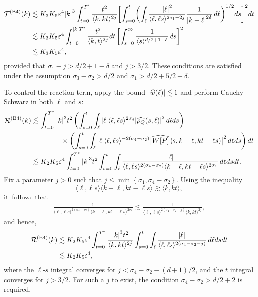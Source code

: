 \documentclass[JEP,XML,SOM,Unicode]{cedram}
\newcommand{\babs}[1]{\bigl|#1\bigr|}
\theoremstyle{plain}
\theoremstyle{remark}
\newcommand{\br}[1]{\left(#1\right)}
\newcommand{\bbbr}[1]{\biggl(#1 \biggr)}
\newcommand{\ak}{\abs{k}}
\newcommand{\sbbbr}[1]{\biggl[#1\biggr]}
\newcommand{\sbr}[1]{\left[#1\right]}
\newcommand{\jb}[1]{\langle#1\rangle}
\newcommand{\set}[1]{\left\{#1\right\}}
\newcommand{\ep}{\varepsilon}
\begin{document}
\begin{align*}
\mathcal{T}^{\mathrm{(B4)}}(k)&\lesssim K_3K_5\ep^4\ak^3\int_{t=0}^{T^*}\frac{t^2}{\jb{k,kt}^{2j}}\sbbbr{\int_{s=0}^t\bbbr{\int_\ell\frac{\abs{\ell}^2}{\jb{\ell,\ell s}^{2\sigma_1-2j}}\frac{1}{\abs{k-\ell}^{2\delta}}\,d\ell}^{1/2} ds}^2dt\\
&\lesssim K_3K_5\ep^4\int_{t=0}^{\ak T^*}\frac{t^2}{\jb{k,t}^{2j}}dt\sbr{\int_{s=0}^\infty\frac{1}{\jb{s}^{{d/2}+1-\delta}} \,ds}^2\\
&\lesssim K_3K_5\ep^4,
\end{align*}provided that $\sigma_1-j>d/2+1-\delta$ and $j>3/2$. These conditions are satisfied under the assumption $\sigma_3-\sigma_2>d/2$ and $\sigma_1>d/2+5/2-\delta$.

To control the reaction term, apply the bound $\abs{\widehat w(\ell)}\lesssim1$ and perform Cauchy--Schwarz in both $\ell$ and $s$:
\begin{align*}
\mathcal{R}^{\mathrm{(B4)}}(k)&\lesssim \int_{t=0}^{T^*}\abs{k}^3t^2\br{\int_{s=0}^t\int_\ell\abs{\ell}\jb{\ell,\ell s}^{2\sigma_4}\abs{\widehat{\rho_Q}(s,\ell)}^2\,d\ell ds}\\ &\hspace{1.5cm}\times\br{\int_{s=0}^t\int_\ell\abs{\ell}\jb{\ell,\ell s}^{-2(\sigma_4-\sigma_2)}\babs{\widehat {W[P]}\br{s,k-\ell,kt-\ell s}}^2\,d\ell ds}dt\\
&\lesssim K_2K_5 \ep^4\int_{t=0}^{T^*}\abs{k}^3t^2\int_{s=0}^t\int_\ell \frac{\abs{\ell}}{\jb{\ell,\ell s}^{2(\sigma_4-\sigma_2)}\jb{k-\ell,kt-\ell s}^{2\sigma_1}}\,d\ell dsdt.
\end{align*}Fix a parameter $j>0$ such that $j\leq \min\set{\sigma_1,\sigma_4-\sigma_2}$. Using the inequality
\[
\jb{\ell,\ell s}\jb{k-\ell,kt-\ell s}\gtrsim\jb{k,k t},
\]
it~follows that
\begin{align*}
\frac{1}{\jb{\ell,\ell s}^{2(\sigma_4-\sigma_2)}\jb{k-\ell,kt-\ell s}^{2\sigma_1}}\lesssim\frac{1}{\jb{\ell,\ell s}^{2(\sigma_4-\sigma_2-j)}\jb{k,kt}^{2j}},
\end{align*}
and hence,
\begin{align*}
\mathcal{R}^{\mathrm{(B4)}}(k)&\lesssim K_2K_5 \ep^4\int_{t=0}^{T^*}\frac{\abs{k}^3t^2}{\jb{k,kt}^{2j}}\int_{s=0}^t\int_\ell \frac{\abs{\ell}}{\jb{\ell,\ell s}^{2(\sigma_4-\sigma_2-j)}}\,d\ell dsdt \\
&\lesssim K_2K_5 \ep^4,
\end{align*}where the $\ell$-$s$ integral converges for $j<\sigma_4-\sigma_2-(d+1)/2$, and the $t$ integral converges for $j>3/2$. For such a $j$ to exist, the condition $\sigma_4-\sigma_2>d/2+2$ is required.
\end{document}
